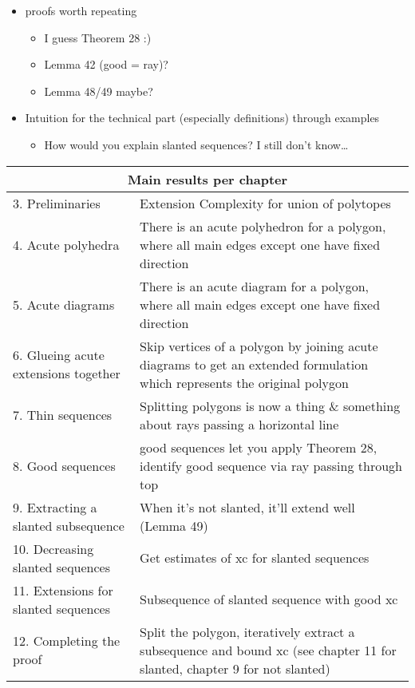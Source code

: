 \begin{itemize}
\begin{itemize}
\begin{itemize}
    \end{itemize}
  \end{itemize}
  \item proofs worth repeating
  \begin{itemize}
    \item I guess Theorem 28 :)
    \item Lemma 42 (good = ray)?
    \item Lemma 48/49 maybe?
  \end{itemize}
  \item Intuition for the technical part (especially definitions) through examples
  \begin{itemize}
    \item How would you explain slanted sequences? I still don't know\dots
  \end{itemize}
\end{itemize}

\begin{tabular}{| p{50mm} | p{100mm} |}
  \hline
  \multicolumn{2}{|c|}{\textbf{Main results per chapter}}\\ \hline
  3. Preliminaries & Extension Complexity for union of polytopes \\ \hline
  4. Acute polyhedra & There is an acute polyhedron for a polygon, where all main edges except one have fixed direction \\ \hline
  5. Acute diagrams & There is an acute diagram for a polygon, where all main edges except one have fixed direction \\ \hline
  6. Glueing acute extensions together & Skip vertices of a polygon by joining acute diagrams to get an extended formulation which represents the original polygon \\ \hline
  7. Thin sequences & Splitting polygons is now a thing \& something about rays passing a horizontal line \\ \hline
  8. Good sequences & good sequences let you apply Theorem 28, identify good sequence via ray passing through top \\ \hline
  9. Extracting a slanted subsequence & When it's not slanted, it'll extend well (Lemma 49) \\ \hline
  10. Decreasing slanted sequences & Get estimates of xc for slanted sequences \\ \hline
  11. Extensions for slanted sequences & Subsequence of slanted sequence with good xc \\ \hline
  12. Completing the proof & Split the polygon, iteratively extract a subsequence and bound xc (see chapter 11 for slanted, chapter 9 for not slanted) \\ \hline
\end{tabular}



